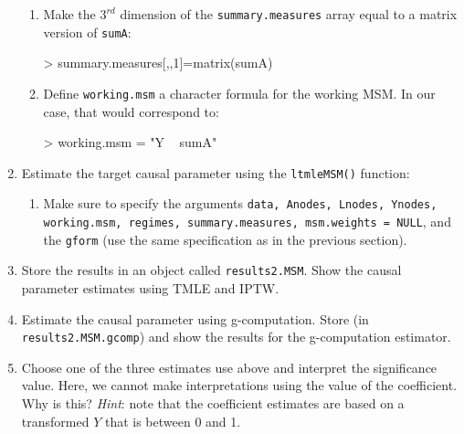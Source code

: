 \documentclass{exam}
\begin{document}
\begin{enumerate}
\begin{enumerate}
\item Make the $3^{rd}$ dimension of the \texttt{summary.measures} array equal to a matrix version of \texttt{sumA}:
\begin{Schunk}
\begin{Sinput}
> summary.measures[,,1]=matrix(sumA)
\end{Sinput}
\end{Schunk}
\item Define \texttt{working.msm} a character formula for the working MSM. In our case, that would correspond to:
\begin{Schunk}
\begin{Sinput}
> working.msm = "Y ~ sumA"
\end{Sinput}
\end{Schunk}
\end{enumerate}
\item Estimate the target causal parameter using the \texttt{ltmleMSM()} function:
\begin{enumerate}
\item Make sure to specify the arguments \texttt{data, Anodes, Lnodes, Ynodes, working.msm, regimes, summary.measures, msm.weights = NULL}, and the \texttt{gform} (use the same specification as in the previous section).
\end{enumerate}
\item Store the results in an object called \texttt{results2.MSM}. Show the causal parameter estimates using TMLE and IPTW.
\item Estimate the causal parameter using g-computation. Store (in \texttt{results2.MSM.gcomp}) and show the results for the g-computation estimator.
\item Choose one of the three estimates use above and interpret the significance value. Here, we cannot make interpretations using the value of the coefficient. Why is this? \textit{Hint}: note that the coefficient estimates are based on a transformed $Y$ that is between 0 and 1.
\end{enumerate}
\end{document}
